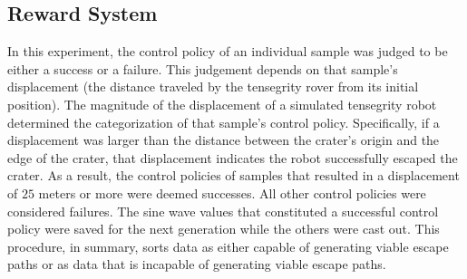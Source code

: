 \documentclass{llncs}
\begin{document}
\subsection{Reward System}
\label{rewardsystem} {
In this experiment, the control policy of an individual sample was judged to be either a success or a failure.
This judgement depends on that sample's displacement (the distance traveled by the tensegrity rover from its initial position).
The magnitude of the displacement of a simulated tensegrity robot determined the categorization of that sample's control policy.
Specifically, if a displacement was larger than the distance between the crater's origin and the edge of the crater, that displacement indicates the robot successfully escaped the crater.
As a result, the control policies of samples that resulted in a displacement of $25$ meters or more were deemed successes.
All other control policies were considered failures.
The sine wave values that constituted a successful control policy were saved for the next generation while the others were cast out.
This procedure, in summary, sorts data as either capable of generating viable escape paths or as data that is incapable of generating viable escape paths.
}
\end{document}
